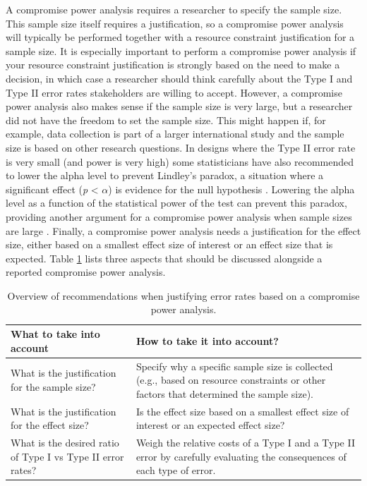 \documentclass[
  oneside]{book}
\begin{document}
A compromise power analysis requires a researcher to specify the sample size. This sample size itself requires a justification, so a compromise power analysis will typically be performed together with a resource constraint justification for a sample size. It is especially important to perform a compromise power analysis if your resource constraint justification is strongly based on the need to make a decision, in which case a researcher should think carefully about the Type I and Type II error rates stakeholders are willing to accept. However, a compromise power analysis also makes sense if the sample size is very large, but a researcher did not have the freedom to set the sample size. This might happen if, for example, data collection is part of a larger international study and the sample size is based on other research questions. In designs where the Type II error rate is very small (and power is very high) some statisticians have also recommended to lower the alpha level to prevent Lindley's paradox, a situation where a significant effect (\emph{p} \textless{} \(\alpha\)) is evidence for the null hypothesis \citep{jeffreys_theory_1939, good_bayesnon-bayes_1992}. Lowering the alpha level as a function of the statistical power of the test can prevent this paradox, providing another argument for a compromise power analysis when sample sizes are large \citep{maier_justify_2022}. Finally, a compromise power analysis needs a justification for the effect size, either based on a smallest effect size of interest or an effect size that is expected. Table \ref{tab:table-compromise-just} lists three aspects that should be discussed alongside a reported compromise power analysis.

\begin{table}

\caption{\label{tab:table-compromise-just}Overview of recommendations when justifying error rates based on a compromise power analysis.}
\centering
\begin{tabular}[t]{l|l}
\hline
What to take into account & How to take it into account?\\
\hline
What is the justification for the sample size? & Specify why a specific sample size is collected (e.g., based on resource constraints or other factors that determined the sample size).\\
\hline
What is the justification for the effect size? & Is the effect size based on a smallest effect size of interest or an expected effect size?\\
\hline
What is the desired ratio of Type I vs Type II error rates? & Weigh the relative costs of a Type I and a Type II error by carefully evaluating the consequences of each type of error.\\
\hline
\end{tabular}
\end{table}
\end{document}
